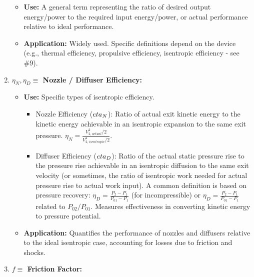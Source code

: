 \begin{enumerate}
  \begin{itemize}
  \tightlist
  \item
    \textbf{Use:} A general term representing the ratio of desired
    output energy/power to the required input energy/power, or actual
    performance relative to ideal performance.
  \item
    \textbf{Application:} Widely used. Specific definitions depend on
    the device (e.g., thermal efficiency, propulsive efficiency,
    isentropic efficiency - see \#9).
  \end{itemize}
\item
  \textbf{\(\eta_N, \eta_D \equiv\) Nozzle / Diffuser Efficiency:}

  \begin{itemize}
  \tightlist
  \item
    \textbf{Use:} Specific types of isentropic efficiency.

    \begin{itemize}
    \tightlist
    \item
      Nozzle Efficiency (\(\\eta_N\)): Ratio of actual exit kinetic
      energy to the kinetic energy achievable in an isentropic expansion
      to the same exit pressure.
      \(\eta_N = \frac{V_{2, actual}^2 / 2}{V_{2, isentropic}^2 / 2}\).
    \item
      Diffuser Efficiency (\(\\eta_D\)): Ratio of the actual static
      pressure rise to the pressure rise achievable in an isentropic
      diffusion to the same exit velocity (or sometimes, the ratio of
      isentropic work needed for actual pressure rise to actual work
      input). A common definition is based on pressure recovery:
      \(\eta_D = \frac{P_{2} - P_{1}}{P_{01} - P_{1}}\) (for
      incompressible) or
      \(\eta_D = \frac{P_{2} - P_{1}}{P_{01} - P_{1}}\) related to
      \(P_{02}/P_{01}\). Measures effectiveness in converting kinetic
      energy to pressure potential.
    \end{itemize}
  \item
    \textbf{Application:} Quantifies the performance of nozzles and
    diffusers relative to the ideal isentropic case, accounting for
    losses due to friction and shocks.
  \end{itemize}
\item
  \textbf{\(f \equiv\) Friction Factor:}


\end{enumerate}
